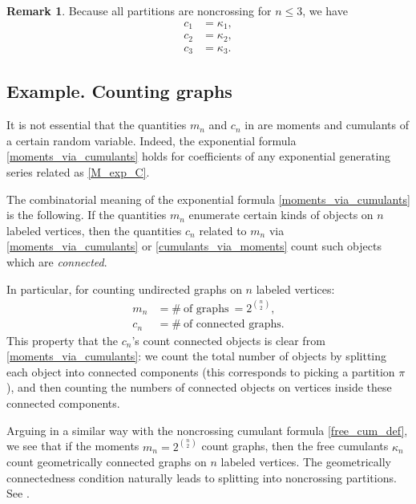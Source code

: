 \documentclass[letterpaper,11pt,oneside,reqno]{amsart}
\numberwithin{equation}{section}
\theoremstyle{definition}
\newtheorem{remark}[proposition]{Remark}
\begin{document}
\begin{remark}
	Because all partitions are noncrossing for $n\leq 3$, we have
	 \begin{align*}
	     c_1& =\kappa_1,\\
	     c_2& =\kappa_2,\\
	     c_3& =\kappa_3.
	 \end{align*}
\end{remark}


\subsection{Example. Counting graphs} %
\label{sub:example_counting_graphs}

It is not essential that the quantities $m_n$ and $c_n$ in 
are moments and cumulants of a certain random variable. 
Indeed, the exponential formula \eqref{moments_via_cumulants} holds
for coefficients of any exponential generating series related as 
\eqref{M_exp_C}.

The combinatorial meaning of the exponential formula \eqref{moments_via_cumulants}
is the following. If the quantities $m_n$ enumerate
certain kinds of objects on $n$ labeled vertices,
then the quantities $c_n$ related to $m_n$ via \eqref{moments_via_cumulants} 
or \eqref{cumulants_via_moments} count such objects which are \emph{connected}.

In particular, for counting undirected graphs on $n$ labeled vertices:
\begin{align*}
     m_n& =\# \ \text{of graphs}\ =2^{{n}\choose{2}},\\
     c_n& =\# \ \text{of connected graphs}.
\end{align*}
This property that the $c_n$'s count connected objects 
is clear from \eqref{moments_via_cumulants}: we count the total number
of objects by splitting each object into connected components
(this corresponds to picking a partition $\pi$),
and then counting the numbers of connected objects on vertices
inside these connected components.

Arguing in a similar way with the noncrossing cumulant formula \eqref{free_cum_def},
we see that if the moments $m_n=2^{\binom n2}$ count graphs, then the free cumulants
$\kappa_n$ count geometrically connected graphs on $n$ labeled vertices.
The geometrically connectedness condition naturally leads to splitting into noncrossing partitions.
See .
\end{document}
